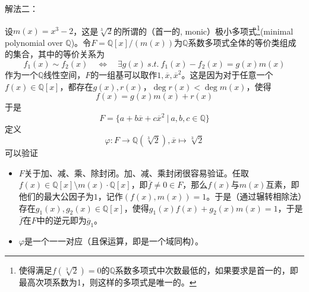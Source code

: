 解法二：

设$m(x) = x^3 - 2$，这是$\sqrt[3]{2}$的所谓的（首一的, monic）极小多项式\footnote{使得满足$f(\sqrt[3]{2})=0$的$\mathbb{Q}$系数多项式中次数最低的，如果要求是首一的，即最高次项系数为1，则这样的多项式是唯一的。}(minimal polynomial over $\mathbb{Q}$)。令$F = \mathbb{Q}[x] / (m(x))$为$\mathbb{Q}$系数多项式全体的等价类组成的集合，其中的等价关系为
$$f_1(x) \sim f_2(x) \quad \Longleftrightarrow \quad \exists g(x) \ s.t.\ f_1(x)-f_2(x) = g(x)m(x)$$
作为一个$\mathbb{Q}$线性空间，$F$的一组基可以取作$1, \overline{x}, \overline{x}^2$。这是因为对于任意一个$f(x) \in \mathbb{Q}[x]$，都存在$g(x), r(x)$，$\deg r(x) < \deg m(x)$，使得
$$f(x) = g(x)m(x) + r(x)$$
于是
$$F = \{ a + b\overline{x} + c\overline{x}^2 \ |\ a,b,c\in\mathbb{Q} \}$$
定义
$$\varphi : F \to \mathbb{Q}(\sqrt[3]{2}), \overline{x} \mapsto \sqrt[3]{2}$$
可以验证
\begin{itemize}
    \item $F$关于加、减、乘、除封闭。加、减、乘封闭很容易验证。任取$f(x) \in \mathbb{Q}[x] \setminus m(x)\cdot\mathbb{Q}[x]$，即$\overline{f} \neq 0 \in F$，那么$f(x)$与$m(x)$互素，即他们的最大公因子为$1$，记作$(f(x), m(x)) = 1$。于是（通过辗转相除法）存在$g_1(x), g_2(x) \in \mathbb{Q}[x]$，使得$g_1(x)f(x) + g_2(x)m(x) = 1$，于是$\overline{f}$在$F$中的逆元即为$\overline{g}_1$。
    \item $\varphi$是一个一一对应（且保运算，即是一个域同构）。
\end{itemize}



